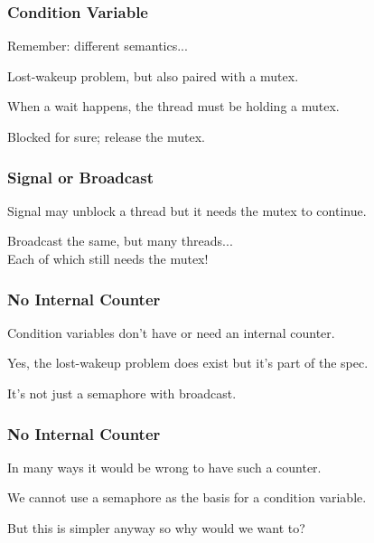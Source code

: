 \begin{frame}
\frametitle{Condition Variable}

Remember: different semantics...

Lost-wakeup problem, but also paired with a mutex.

When a wait happens, the thread must be holding a mutex.

Blocked for sure; release the mutex.

\end{frame}

\begin{frame}
\frametitle{Signal or Broadcast}

Signal may unblock a thread but it needs the mutex to continue.

Broadcast the same, but many threads...\\
\quad Each of which still needs the mutex!

\end{frame}

\begin{frame}
\frametitle{No Internal Counter}

Condition variables don't have or need an internal counter.

Yes, the lost-wakeup problem does exist but it's part of the spec.

It's not just a semaphore with broadcast.

\end{frame}

\begin{frame}
\frametitle{No Internal Counter}

In many ways it would be wrong to have such a counter.

We cannot use a semaphore as the basis for a condition variable.

But this is simpler anyway so why would we want to?

\end{frame}




